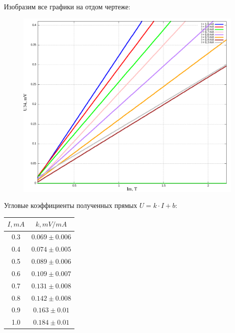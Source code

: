 \documentclass{article}
\begin{document}
Изобразим все графики на отдом чертеже:

\begin{figure}[H]
    \centering
    \includegraphics[width=\textwidth]{multy-plot.png}
\end{figure}
    

Угловые коэффициенты полученных прямых \( U = k \cdot I + b \):

\begin{table}[H]
    \centering
    \begin{tabular}{|c|c|}
        \hline
        \( I, mA \) & \( k, mV/mA \) \\\hline
        0.3 & \( 0.069 \pm 0.006 \)  \\\hline
        0.4 & \( 0.074 \pm 0.005 \) \\\hline
        0.5 & \( 0.089 \pm 0.006 \) \\\hline
        0.6 & \( 0.109 \pm 0.007 \) \\\hline
        0.7 & \( 0.131 \pm 0.008 \) \\\hline
        0.8 & \( 0.142 \pm 0.008 \) \\\hline
        0.9 & \( 0.163 \pm 0.01 \)  \\\hline
        1.0 & \( 0.184 \pm 0.01 \)  \\\hline
    \end{tabular}
\end{table}
\end{document}
